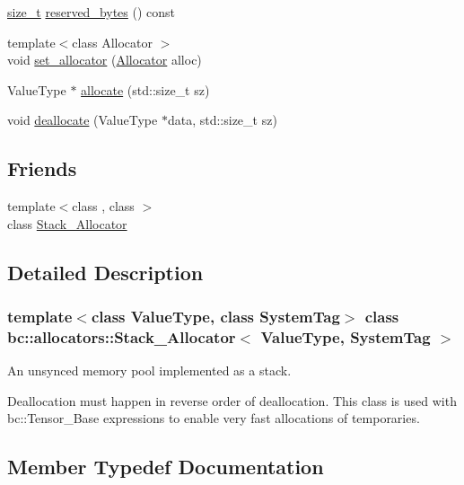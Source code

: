 \begin{DoxyCompactItemize}
\item 
\hyperlink{namespacebc_aaf8e3fbf99b04b1b57c4f80c6f55d3c5}{size\+\_\+t} \hyperlink{classbc_1_1allocators_1_1Stack__Allocator_a29decb9ba112eb6b73955a74955e9a64}{reserved\+\_\+bytes} () const
\item 
{\footnotesize template$<$class Allocator $>$ }\\void \hyperlink{classbc_1_1allocators_1_1Stack__Allocator_aa67df701b95b32e4781f1b607a275f16}{set\+\_\+allocator} (\hyperlink{classbc_1_1allocators_1_1Allocator}{Allocator} alloc)
\item 
Value\+Type $\ast$ \hyperlink{classbc_1_1allocators_1_1Stack__Allocator_a5d7f2cdefd27eff0ea9f2261d3625021}{allocate} (std\+::size\+\_\+t sz)
\item 
void \hyperlink{classbc_1_1allocators_1_1Stack__Allocator_a9cb9920991b8357a447b346e278d6564}{deallocate} (Value\+Type $\ast$data, std\+::size\+\_\+t sz)
\end{DoxyCompactItemize}
\subsection*{Friends}
\begin{DoxyCompactItemize}
\item 
{\footnotesize template$<$class , class $>$ }\\class \hyperlink{classbc_1_1allocators_1_1Stack__Allocator_a0c884348ac6b6c3ee5c2ccc72115267e}{Stack\+\_\+\+Allocator}
\end{DoxyCompactItemize}


\subsection{Detailed Description}
\subsubsection*{template$<$class Value\+Type, class System\+Tag$>$\newline
class bc\+::allocators\+::\+Stack\+\_\+\+Allocator$<$ Value\+Type, System\+Tag $>$}

An unsynced memory pool implemented as a stack. 

Deallocation must happen in reverse order of deallocation. This class is used with bc\+::\+Tensor\+\_\+\+Base expressions to enable very fast allocations of temporaries. 

\subsection{Member Typedef Documentation}
\mbox{\label{classbc_1_1allocators_1_1Stack__Allocator_a0ee5d61459babc228fbb10b3a88c8973}} 
